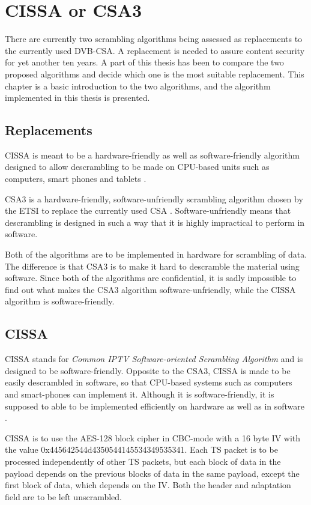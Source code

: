 \chapter{CISSA or CSA3}
There are currently two scrambling algorithms being assessed as 
replacements to the currently used DVB-CSA. A replacement is 
needed to assure content security for yet another ten years.
A part of this thesis has been to compare the two proposed 
algorithms and decide which one is the most suitable replacement.
This chapter is a basic introduction to the two algorithms, and 
the algorithm implemented in this thesis is presented.

\section{Replacements}
CISSA is meant to be a hardware-friendly as well as software-friendly 
algorithm designed to allow descrambling to be made on CPU-based units 
such as computers, smart phones and tablets \citep[p. 9]{DVB:2013}.

CSA3 is a hardware-friendly, software-unfriendly scrambling algorithm 
chosen by the ETSI to replace the currently used CSA 
\citep[pp. 6--7]{DVB:2013}. Software-unfriendly means that descrambling 
is designed in such a way that it is highly impractical to perform in 
software.

Both of the algorithms are to be implemented in hardware for 
scrambling of data. The difference is that CSA3 is to make it hard to 
descramble the material using software. Since both of the algorithms 
are confidential, it is sadly impossible to find out what makes the 
CSA3 algorithm software-unfriendly, while the CISSA algorithm is 
software-friendly. 

\section{CISSA}
CISSA stands for \emph{Common IPTV Software-oriented Scrambling 
Algorithm} and is designed to be software-friendly. Opposite to the 
CSA3, CISSA is made to be easily descrambled in software, so that 
CPU-based systems such as computers and smart-phones can implement 
it.  Although it is software-friendly, it is supposed to able to 
be implemented efficiently on hardware as well as in software 
\citep[p. 9]{DVB:2013}.

CISSA is to use the AES-128 block cipher in CBC-mode with a 16 byte 
IV with the value 0x445642544d4350544145534349535341. Each TS packet 
is to be processed independently of other TS packets, but each block 
of data in the payload depends on the previous blocks of data in the 
same payload, except the first block of data, which depends on the IV. 
Both the header and adaptation field are to be left unscrambled. 
\citep[p. 11]{DVB:2013}

